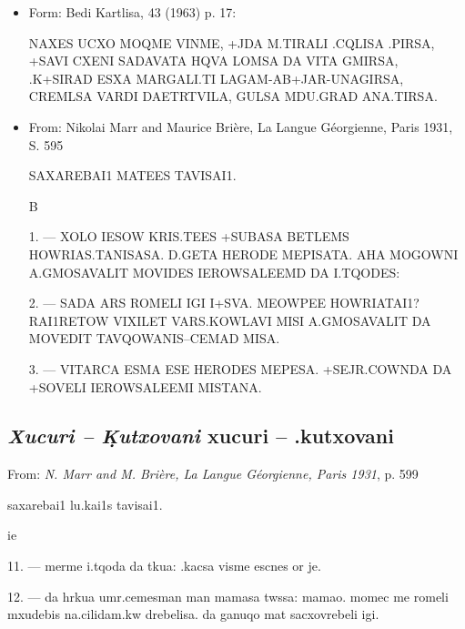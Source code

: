 \documentclass[12pt]{article}
\begin{document}
\begin{itemize}
\item Form: Bedi Kartlisa, 43 (1963) p. 17:

\begin{xucr}
NAXES UCXO MOQME VINME, +JDA M.TIRALI .CQLISA .PIRSA,\\
+SAVI CXENI SADAVATA HQVA LOMSA DA VITA GMIRSA,\\
.K+SIRAD ESXA MARGALI.TI LAGAM-AB+JAR-UNAGIRSA,\\
CREMLSA VARDI DAETRTVILA, GULSA MDU.GRAD ANA.TIRSA.
\end{xucr}

\item From: Nikolai Marr and Maurice Bri\`ere, La Langue G\'eorgienne, Paris
1931, S. 595

\begin{xucr}

\begin{center}
SAXAREBAI1 MATEES TAVISAI1.

B
\end{center}


{\rm 1.} --- XOLO IESOW KRIS.TEES +SUBASA BETLEMS
HOWRIAS\-.TANISASA. D.GETA HERODE MEPISATA. AHA MOGOWNI A.GMO\-SAVALIT
MOVIDES IEROWSALEEMD DA I.TQODES:

{\rm 2.} --- SADA ARS ROMELI IGI I+SVA. MEOWPEE HOWRIATAI1? RAI1RETOW
VIXILET VARS.KOWLAVI MISI A.GMOSAVALIT DA MOVEDIT TAVQOWANIS--CEMAD
MISA.

{\rm 3.} --- VITARCA ESMA ESE HERODES MEPESA. +SEJR.COWNDA DA +SOVELI
IEROWSALEEMI MISTANA.

\end{xucr}
\end{itemize}

\subsection*{\emph{Xucuri -- \d  Kutxovani} \xucr xucuri -- .kutxovani}


From: {\it N. Marr and M. Bri\`ere, La Langue G\'eor\-gienne,
Paris 1931\/}, p. 599

\begin{xucr}
\begin{center}\Large
saxarebai1 lu.kai1s tavisai1.

ie
\end{center}

{\rm 11.} --- merme i.tqoda da tkua: .kacsa visme escnes
or je.

{\rm 12.} --- da hrkua umr.cemesman man mamasa twssa:
mamao. momec me romeli mxudebis na.cilidam.kw drebelisa. da ganuqo
mat sacxovrebeli igi.
\end{xucr}
\end{document}
